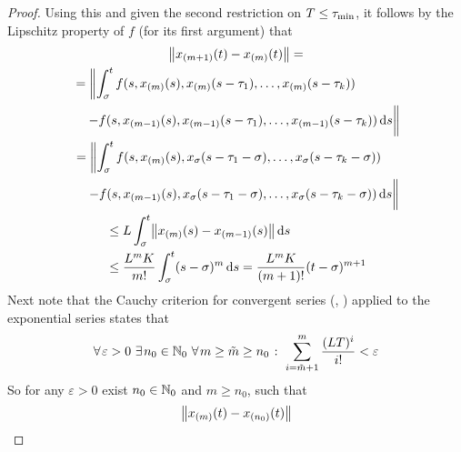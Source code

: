 \begin{proof}
        Using this and given the second restriction on $T\leq\tau_{\min}$, it follows by the Lipschitz property of $f$ (for its first argument) that
        \begin{multline*}
            \nnorm*{\seq{x}{m+1}(t)-\seq{x}{m}(t)} =\\
            \!\begin{multlined}[t][0.8\displaywidth]
                = \left\lVert\integral{\tzero}{t} f(s,\seq{x}{m}(s),\seq{x}{m}(s-\tau_1),\ldots,\seq{x}{m}(s-\tau_k))\right.\\
                \left.- f(s,\seq{x}{m-1}(s),\seq{x}{m-1}(s-\tau_1),\ldots,\seq{x}{m-1}(s-\tau_k))\dx[s]
                \vphantom{\integral{\tzero}{t}}\right\rVert
            \end{multlined}\\
            \!\begin{multlined}[t][0.8\displaywidth]
                = \left\lVert\integral{\tzero}{t} f(s,\seq{x}{m}(s),x_{\tzero}(s-\tau_1-\tzero),\ldots,x_{\tzero}(s-\tau_k-\tzero))\right.\\
                \left.- f(s,\seq{x}{m-1}(s),x_{\tzero}(s-\tau_1-\tzero),\ldots,x_{\tzero}(s-\tau_k-\tzero))\dx[s]
                \vphantom{\integral{\tzero}{t}}\right\rVert
            \end{multlined}\\
            \begin{aligned}
            &\leq L \integral{\tzero}{t} \nnorm*{\seq{x}{m}(s) - \seq{x}{m-1}(s)}\dx[s]\\
            &\leq \frac{L^m K}{m!} \integral{\tzero}{t} (s-\tzero)^m\dx[s]
            = \frac{L^m K}{(m+1)!}(t-\tzero)^{m+1}
            \end{aligned}
        \end{multline*}
        Next note that the Cauchy criterion for convergent series (\cite[Theorem~6.13]{Gathmann12GDM}, \cite[Theorem~3.22]{Rudin76PrinciplesAnalysis}) applied to the exponential series states that
        \begin{equation*}
            \forall\mkern2mu \varepsilon>0\ \exists\mkern2mu n_0\in\mathbb{N}_0\ \forall\mkern2mu m\geq \tilde{m}\geq n_0\mathrel{\colon} \sum_{i=\tilde{m}+1}^m \frac{(LT)^i}{i!} <\varepsilon
        \end{equation*}
        So for any $\varepsilon>0$ exist $n_0\in\mathbb{N}_0$ and $m\geq n_0$, such that
        \begin{align*}
            \nnorm*{\seq{x}{m}(t)-\seq{x}{n_0}(t)}

\end{align*}
\end{proof}
